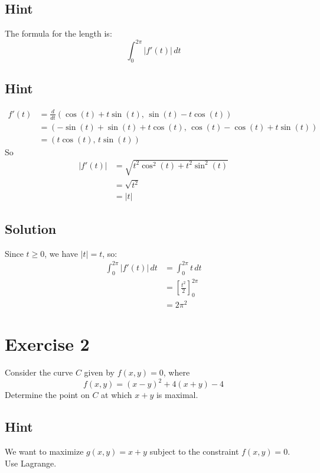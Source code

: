 \documentclass[a4paper,10pt]{article}
\begin{document}
\subsection{Hint}
The formula for the length is:
\[
    \int_{0}^{2\pi} |f'(t)|\,dt
\]

\subsection{Hint}
\begin{align*}
    f'(t) & = \frac{d}{dt} (\cos(t) + t\sin(t), \, \sin(t) - t\cos(t))         \\
          & = (-\sin(t) + \sin(t) + t\cos(t), \, \cos(t) - \cos(t) + t\sin(t)) \\
          & = (t\cos(t), \, t\sin(t))
\end{align*}
So
\begin{align*}
    |f'(t)| & = \sqrt{t^2\cos^2(t) + t^2\sin^2(t)} \\
            & = \sqrt{t^2}                         \\
            & = |t|
\end{align*}

\subsection{Solution}
Since $t \geq 0$, we have $|t| = t$, so:
\begin{align*}
    \int_{0}^{2\pi} |f'(t)|\,dt & = \int_{0}^{2\pi} t \, dt                \\
                                & = \left[ \frac{t^2}{2}\right]_{0}^{2\pi} \\
                                & = 2\pi^2
\end{align*}

\clearpage

\section{Exercise 2}

Consider the curve $C$ given by $f(x,y) = 0$, where
\[
    f(x,y) = (x-y)^2 + 4(x+y) - 4
\]
Determine the point on $C$ at which $x+y$ is maximal.

\subsection{Hint}
We want to maximize $g(x,y) = x+y$ subject to the constraint $f(x,y)=0$. Use Lagrange.
\end{document}
